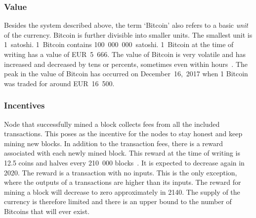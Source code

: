 \subsubsection{Value}
Besides the system described above, the term `Bitcoin' also refers to a basic \textit{unit} of the currency. Bitcoin is further divisible into smaller units. The smallest unit is 1~satoshi. 1~Bitcoin contains 100~000~000~satoshi. 1~Bitcoin at the time of writing has a value of EUR~5~666. The value of Bitcoin is very volatile and has increased and decreased by tens or percents, sometimes even within hours~\cite{Adkisson2018WhyVolatile}. The peak in the value of Bitcoin has occurred on December~16,~2017 when 1 Bitcoin was traded for around EUR~16~500.

\subsubsection{Incentives}
Node that successfully mined a block collects fees from all the included transactions. This poses as the incentive for the nodes to stay honest and keep mining new blocks. In addition to the transaction fees, there is a reward associated with each newly mined block. This reward at the time of writing is 12.5 coins and halves every 210~000 blocks~\cite{Judmayer2017BlocksMechanisms}. It is expected to decrease again in 2020. The reward is a transaction with no inputs. This is the only exception, where the outputs of a transactions are higher than its inputs. The reward for mining a block will decrease to zero approximately in 2140. The supply of the currency is therefore limited and there is an upper bound to the number of Bitcoins that will ever exist\footnotemark.



